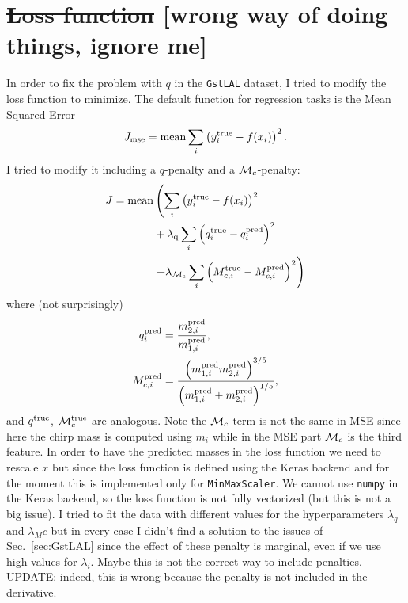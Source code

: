 \documentclass[prd,aps,twocolumn,a4paper,showkeys,nofootinbib]{article}
\def\Mc{{\cal M}_c}
\begin{document}
\section{\sout{Loss function} [wrong way of doing things, ignore me]}
\label{sec:loss}
In order to fix the problem with $q$ in the \texttt{GstLAL} dataset, 
I tried to modify the loss function to minimize.
The default function for regression tasks is the Mean Squared Error
\begin{equation}
J_{\rm mse} = {\rm mean} \sum_i \left( y^{\rm true}_i - f(x_i) \right)^2 .
\end{equation}
I tried to modify it including a $q$-penalty and a $\Mc$-penalty:
\begin{align}
J =  {\rm mean} & \left(  \sum_i \left( y^{\rm true}_i - f(x_i) \right)^2 \right.   \nonumber \\
&  + \lambda_{\rm q} \sum_i \left( q^{\rm true}_i - q^{\rm pred}_i \right)^2
\nonumber \\
& \left. + \lambda_{\rm \Mc} \sum_i \left( M_{c,i}^{\rm true} - M_{c,i}^{\rm pred} \right)^2 \right)
\end{align}
where (not surprisingly)
\begin{align}
q^{\rm pred}_i &  = \frac{m_{2,i}^{\rm pred}}{m_{1,i}^{\rm pred}}, \\
M_{c,i}^{\rm pred} & = 
\frac{\left(m_{1,i}^{\rm pred}m_{2,i}^{\rm pred} \right)^{3/5}}{\left(m_{1,i}^{\rm pred}+m_{2,i}^{\rm pred}\right)^{1/5}},
\end{align}
and $q^{\rm true}$, $\Mc^{\rm true}$ are analogous. Note the $\Mc$-term is not the same 
in MSE since here the chirp mass is computed using $m_i$ while in the MSE part $\Mc$ 
is the third feature.
In order to have the predicted masses in the loss function we need to 
rescale $x$ but since the loss function is defined using the Keras backend and 
for the moment this is implemented only for  \texttt{MinMaxScaler}. 
We cannot use \texttt{numpy} in the Keras backend, so the loss function is not fully vectorized
(but this is not a big issue). 
I tried to fit the data with different values for the hyperparameters $\lambda_q$ and
$\lambda_Mc$ but in every case I didn't find a solution to the issues of Sec.~\ref{sec:GstLAL}
since the effect of these penalty is marginal, even if we use high values for $\lambda_i$.
Maybe this is not the correct way to include penalties. 
UPDATE: indeed, this is wrong because the penalty is not included in the derivative.
\end{document}
